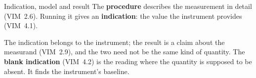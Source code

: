 \documentclass[aspectratio=169,11pt]{beamer}
\begin{document}
\begin{frame}[label=indication]{Indication, model and result}
The \textbf{procedure} describes the measurement in detail (VIM~2.6). Running it gives an \textbf{\textcolor{report}{indication}}: the value the instrument provides (VIM~4.1).

\vspace{0.3em}
\begin{center}
\end{center}

\vspace{0.2em}
{\small The indication belongs to the instrument; the result is a claim about the measurand (VIM~2.9), and the two need not be the same kind of quantity. The \textbf{blank indication} (VIM~4.2) is the reading where the quantity is supposed to be absent. It finds the instrument's baseline.}
\end{frame}
\end{document}
